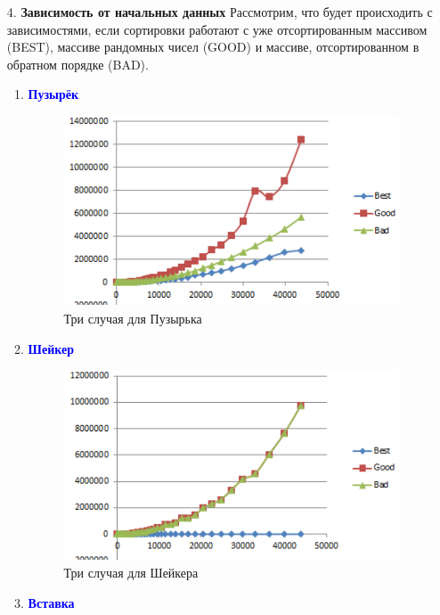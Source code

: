 \documentclass[a4paper, 12pt]{article}
\begin{document}
\begin{enumerate}
    \item[4.] \textbf{Зависимость от начальных данных} \newline
    Рассмотрим, что будет происходить с зависимостями, если сортировки работают с уже отсортированным массивом (BEST), массиве рандомных чисел (GOOD) и массиве, отсортированном в обратном порядке (BAD).
    \begin{enumerate}
        \item \textcolor{blue}{\textbf{Пузырёк}}
            \begin{figure}[h!]
            \centering
    		      \includegraphics[scale = 0.55]{7.png}
    		      \caption{Три случая для Пузырька}
    		      \label{fig:my_label}
    	\end{figure}
    \newpage
        \item \textcolor{blue}{\textbf{Шейкер}}
    \begin{figure}[h!]
            \centering
    		      \includegraphics[scale = 0.55]{8.png}
    		      \caption{Три случая для Шейкера}
    		      \label{fig:my_label}
    	\end{figure}
        \item \textcolor{blue}{\textbf{Вставка}}

\end{enumerate}
\end{enumerate}
\end{document}
